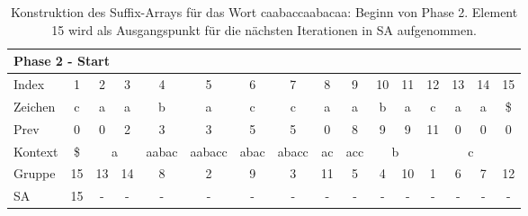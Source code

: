 \begin{table}[H]
\centering
\begin{adjustbox}{max width=\textwidth}
\centering
\begin{tabular}{lccccccccccccccc}
\multicolumn{16}{l}{Phase 2 - Start}                                                                                                                                                                                                                                                                                  \\ \hline
\multicolumn{1}{l|}{Index}   & 1                       & 2  & 3                       & 4                          & 5                           & 6                         & 7                          & 8                       & 9                        & 10 & 11                      & 12  & 13  & 14  & 15  \\
\multicolumn{1}{l|}{Zeichen} & c                       & a  & a                       & b                          & a                           & c                         & c                          & a                       & a                        & b  & a                       & c   & a   & a   & \$  \\
\multicolumn{1}{l|}{Prev}    & 0                       & 0  & 2                       & 3                          & 3                           & 5                         & 5                          & 0                       & 8                        & 9  & 9                       & 11  & 0   & 0   & 0   \\ \hline
\multicolumn{1}{l|}{Kontext} & \multicolumn{1}{c|}{\$} & \multicolumn{2}{c|}{a}       & \multicolumn{1}{c|}{aabac} & \multicolumn{1}{c|}{aabacc} & \multicolumn{1}{c|}{abac} & \multicolumn{1}{c|}{abacc} & \multicolumn{1}{c|}{ac} & \multicolumn{1}{c|}{acc} & \multicolumn{2}{c|}{b}       & \multicolumn{4}{c}{c} \\
\multicolumn{1}{l|}{Gruppe}  & \multicolumn{1}{c|}{15} & 13 & \multicolumn{1}{c|}{14} & \multicolumn{1}{c|}{8}     & \multicolumn{1}{c|}{2}      & \multicolumn{1}{c|}{9}    & \multicolumn{1}{c|}{3}     & \multicolumn{1}{c|}{11} & \multicolumn{1}{c|}{5}   & 4  & \multicolumn{1}{c|}{10} & 1   & 6   & 7   & 12  \\
\multicolumn{1}{l|}{SA}      & \multicolumn{1}{c|}{15} & -  & \multicolumn{1}{c|}{-}  & \multicolumn{1}{c|}{-}     & \multicolumn{1}{c|}{-}      & \multicolumn{1}{c|}{-}    & \multicolumn{1}{c|}{-}     & \multicolumn{1}{c|}{-}  & \multicolumn{1}{c|}{-}   & -  & \multicolumn{1}{c|}{-}  & -   & -   & -   & -  
\end{tabular}
\end{adjustbox}

\caption[Konstruktion des Suffix-Arrays für das Wort caabaccaabacaa: Beginn von Phase 2]{Konstruktion des Suffix-Arrays für das Wort caabaccaabacaa: Beginn von Phase 2. Element 15 wird als Ausgangspunkt für die nächsten Iterationen in SA aufgenommen.}
\label{table_complex_example_2_start} 
\end{table}

